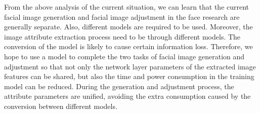 \vspace{3ex}

From the above analysis of the current situation,
    we can learn that the current facial image generation and facial image adjustment in the face research are generally separate.
Also, different models are required to be used.
Moreover, the image attribute extraction process need to be through different models.
The conversion of the model is likely to cause certain information loss.
Therefore, we hope to use a model to complete the two tasks of facial image generation and adjustment so that not only the network layer parameters of the extracted image features can be shared,
    but also the time and power consumption in the training model can be reduced.
During the generation and adjustment process, the attribute parameters are unified,
    avoiding the extra consumption caused by the conversion between different models.
